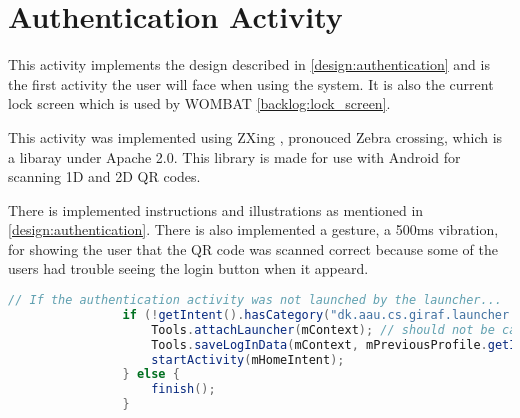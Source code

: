 \section{Authentication Activity}

This activity implements the design described in \autoref{design:authentication} and is the first activity the user will face when using the \giraf[] system. It is also the current lock screen which is used by WOMBAT \autoref{backlog:lock_screen}.

This activity was implemented using ZXing \citep{web:ZXing}, pronouced Zebra crossing, which is a libaray under Apache 2.0. This library is made for use with Android for scanning 1D and 2D QR codes.


There is implemented instructions and illustrations as mentioned in \autoref{design:authentication}. There is also implemented a gesture, a 500ms vibration, for showing the user that the QR code was scanned correct because some of the users had trouble seeing the login button when it appeard.

\begin{lstlisting}[style=sourceCode, language=JAVA, caption=This is code, label=lst:authenticationAcitivity] 
				// If the authentication activity was not launched by the launcher...
				if (!getIntent().hasCategory("dk.aau.cs.giraf.launcher.GIRAF")) {
					Tools.attachLauncher(mContext); // should not be called
					Tools.saveLogInData(mContext, mPreviousProfile.getId());
					startActivity(mHomeIntent);
				} else {
					finish();
				}
\end{lstlisting}
